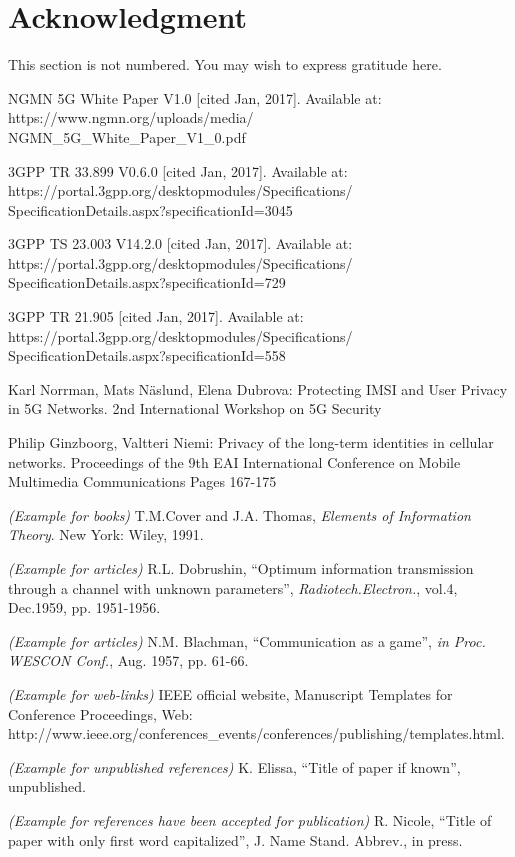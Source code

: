 \documentclass[conference]{IEEEtran}
\begin{document}
\section*{Acknowledgment}
This section is not numbered. You may wish to express gratitude here.

\begin{thebibliography}{6}

 NGMN 5G White Paper V1.0 [cited Jan, 2017]. Available at: https://www.ngmn.org/uploads/media/\\NGMN\_5G\_White\_Paper\_V1\_0.pdf

 3GPP TR 33.899 V0.6.0 [cited Jan, 2017]. Available at: https://portal.3gpp.org/desktopmodules/Specifications/\\SpecificationDetails.aspx?specificationId=3045

 3GPP TS 23.003 V14.2.0 [cited Jan, 2017]. Available at: https://portal.3gpp.org/desktopmodules/Specifications/\\SpecificationDetails.aspx?specificationId=729

 3GPP TR 21.905 [cited Jan, 2017]. Available at: https://portal.3gpp.org/desktopmodules/Specifications/\\SpecificationDetails.aspx?specificationId=558


 Karl Norrman, Mats N\"aslund, Elena Dubrova: Protecting IMSI and User Privacy in 5G Networks. 2nd International Workshop on 5G Security

 Philip Ginzboorg,  Valtteri Niemi: Privacy of the long-term identities in cellular networks. Proceedings of the 9th EAI International Conference on Mobile Multimedia Communications
Pages 167-175


\textit{(Example for books)} T.M.Cover and J.A. Thomas, \emph{Elements of Information Theory}. New York: Wiley, 1991.

\textit{(Example for articles)} R.L. Dobrushin, ``Optimum information transmission through a channel with unknown parameters'',  \emph{Radiotech.Electron.}, vol.4, Dec.1959, pp. 1951-1956.

\textit{(Example for articles)} N.M. Blachman, ``Communication as a game'', \emph{in Proc. WESCON Conf.}, Aug. 1957, pp. 61-66.

\textit{(Example for web-links)} IEEE official website, Manuscript Templates for Conference Proceedings, Web: http://www.ieee.org/conferences\_events/conferences/publishing/templates.\newline html.

\textit{(Example for unpublished references)} K. Elissa, ``Title of paper if known'', unpublished.

\textit{(Example for references have been accepted for publication)} R. Nicole, ``Title of paper with only first word capitalized'', J. Name Stand. Abbrev., in press.

\end{thebibliography}
\end{document}
